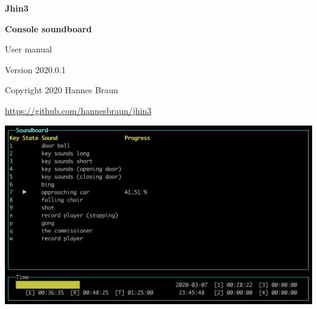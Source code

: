 \documentclass[12pt,a4paper]{article}
\begin{document}

\pagestyle{fancy}
\cfoot{}

\thispagestyle{empty}
\begin{center}
\begin{Huge}
\textbf{Jhin3}
\end{Huge}

\begin{Large}
\vspace{0.4cm}
\textbf{Console soundboard}
\end{Large}

\begin{large}
\vspace{0.1cm}
User manual

\vspace{1cm}

Version 2020.0.1

\vspace{0.7cm}

Copyright \textcopyright{} 2020 Hannes Braun

\href{https://github.com/hannesbraun/jhin3}{https://github.com/hannesbraun/jhin3}
\end{large}

\vspace{2.4cm}
\includegraphics[scale=0.6]{../preview.png}

\end{center}
\newpage

\tableofcontents
\newpage





\end{document}
